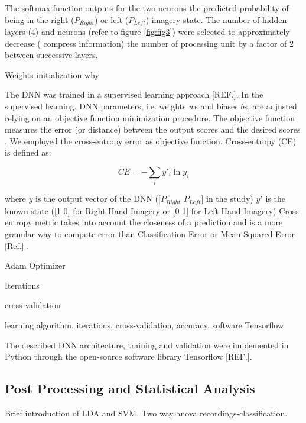 \documentclass[12pt ]{iopart}
\begin{document}
The softmax function outputs for the two neurons  the predicted probability of being in the right ($P_{Right}$) or left ($P_{Left}$) imagery state. The number of hidden layers (4) and neurons (refer to figure \ref{fig:fig3}) were selected to approximately decrease ( compress information) the number of processing unit by a factor of 2 between successive layers. 

Weights initialization why

The DNN was trained in a supervised learning approach [REF.].
In the supervised learning, DNN parameters, i.e. weights $w$s and biases $b$s, are adjusted relying on an objective function minimization procedure. The objective function measures the error (or distance) between the output scores and the desired scores . We employed the cross-entropy error as objective function.
Cross-entropy (CE) is defined as:

\begin{equation}
CE=
-\sum \limits_i y'_{i}\ln y_{i}
\end{equation}

where $y$ is the output vector of the DNN ([$P_{Right}$  $P_{Left}$] in the study) $y'$ is the known state ([1 0] for Right Hand Imagery or [0 1] for Left Hand Imagery)
 Cross-entropy metric takes into account the closeness of a prediction and is a more granular way to compute error than Classification Error or Mean Squared Error [Ref.] .
 
Adam Optimizer

Iterations

cross-validation

 learning algorithm,  iterations, cross-validation,  accuracy, software Tensorflow
 
 The described DNN architecture, training and validation were implemented in Python  through the open-source software library Tensorflow [REF.].

\subsection{Post Processing and Statistical Analysis}
Brief introduction of LDA and SVM.
Two way anova recordings-classification.
\end{document}
